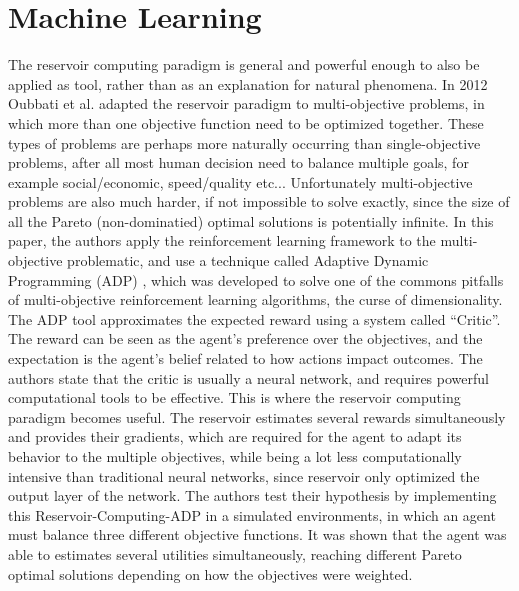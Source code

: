 \documentclass[12pt,oneside]{CUNY_CS_PhD}
\begin{document}

\section{Machine Learning}
The reservoir computing paradigm is general and powerful enough to also be applied as tool, rather than as an explanation for natural phenomena. In 2012 Oubbati et al. \cite{oubbati_multiobjective_2012} adapted the reservoir paradigm to multi-objective problems, in which more than one objective function need to be optimized together.
These types of problems are perhaps more naturally occurring than single-objective problems, after all most human decision need to balance multiple goals, for example social/economic, speed/quality etc... Unfortunately multi-objective problems are also much harder, if not impossible to solve exactly, since the size of all the Pareto (non-dominatied) optimal solutions is potentially infinite. In this paper, the authors apply the reinforcement learning framework to the multi-objective problematic, and use a technique called Adaptive Dynamic Programming (ADP) \cite{wang2009adaptive}, which was developed to solve one of the commons pitfalls of multi-objective reinforcement learning algorithms, the curse of dimensionality. The ADP tool approximates the expected reward using a system called ``Critic''. The reward can be seen as the agent's preference over the objectives, and the expectation is the agent's belief related to how actions impact outcomes. The authors state that the critic is usually a neural network, and requires powerful computational tools to be effective. This is where the reservoir computing paradigm becomes useful. The reservoir estimates several rewards simultaneously and provides their gradients, which are required for the agent to adapt its behavior to the multiple objectives, while being a lot less computationally intensive than traditional neural networks, since reservoir only optimized the output layer of the network.
The authors test their hypothesis by implementing this Reservoir-Computing-ADP in a simulated environments, in which an agent must balance three different objective functions. It was shown that the agent was able to estimates several utilities simultaneously, reaching different Pareto optimal solutions depending on how the objectives were weighted.
\end{document}
